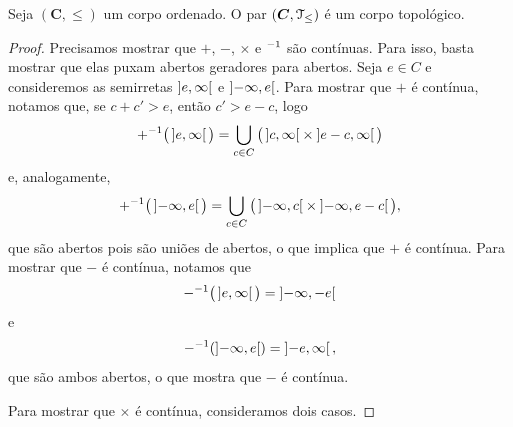 \begin{proposition}
Seja $(\bm C,\leq)$ um corpo ordenado. O par $(\bm C,\mathcal{T}_\leq)$ é um corpo topológico.
\end{proposition}
\begin{proof}
Precisamos mostrar que $+$, $-$, $\times$ e $^{-1}$ são contínuas. Para isso, basta mostrar que elas puxam abertos geradores para abertos. Seja $e \in C$ e consideremos as semirretas $\left]{e},{\infty}\right[$ e $\left]{-\infty},{e}\right[$. Para mostrar que $+$ é contínua, notamos que, se $c+c' > e$, então $c' > e-c$, logo
	\begin{equation*}
	+^{-1} \big( \left]{e},{\infty}\right[ \big) = \bigcup_{c \in C} \big( \left]{c},{\infty}\right[ \times \left]{e-c},{\infty}\right[ \big)
	\end{equation*}
e, analogamente,
	\begin{equation*}
	+^{-1} \big( \left]{-\infty},{e}\right[ \big) = \bigcup_{c \in C} \big( \left]{-\infty},{c}\right[ \times \left]{-\infty},{e-c}\right[ \big),
	\end{equation*}
que são abertos pois são uniões de abertos, o que implica que $+$ é contínua. Para mostrar que $-$ é contínua, notamos que
	\begin{equation*}
	-^{-1} \big( \left]{e},{\infty}\right[ \big) = \left]{-\infty},{-e}\right[
	\end{equation*}
e
	\begin{equation*}
	-^{-1}( \left]{-\infty},{e}\right[ ) = \left]{-e},{\infty}\right[,
	\end{equation*}
que são ambos abertos, o que mostra que $-$ é contínua.

Para mostrar que $\times$ é contínua, consideramos dois casos. 


\end{proof}
